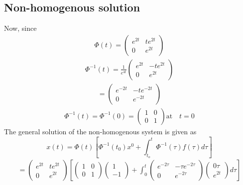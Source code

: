 \documentclass[a4paper, 12pt]{article}
\begin{document}
\subsection{Non-homogenous solution}
Now, since \begin{align*}
\varPhi (t) =
\begin{pmatrix}
e^{2t} & te^{2t}\\
0 & e^{2t}
\end{pmatrix}
\end{align*}
\begin{align*}
\varPhi^{-1} (t) = \frac{1}{e^{4t}}
\begin{pmatrix}
e^{2t} & -te^{2t}\\
0 & e^{2t}
\end{pmatrix}
\end{align*}
\begin{align*}
=
\begin{pmatrix}
e^{-2t} & -te^{-2t} \\
0 & e^{-2t}
\end{pmatrix}
\end{align*}
\begin{align*}
\varPhi^{-1} (t) = \varPhi^{-1}(0) =
\begin{pmatrix}
1 & 0\\
0 & 1
\end{pmatrix} \text{at} \quad t = 0
\end{align*}
The general solution of the non-homogenous system is given as  $$ x(t) = \varPhi (t) \left[\varPhi^{-1}(t_0)x^0 + \int_{t_o}^{t}\varPhi^{-1}(\tau)f(\tau)d\tau\right]$$
\begin{align*}
= 
\begin{pmatrix}
e^{2t} & te^{2t} \\
0 & e^{2t}
\end{pmatrix}
\left[
\begin{pmatrix}
1 & 0 \\
0 & 1
\end{pmatrix}
\begin{pmatrix}
1 \\
-1
\end{pmatrix} + \int_{0}^{t}
\begin{pmatrix}
e^{-2\tau} & -\tau e^{-2\tau} \\
0 & e^{-2\tau}
\end{pmatrix} 
\begin{pmatrix}
0 \tau \\
e^{2t} 
\end{pmatrix} d \tau
\right]
\end{align*}
\end{document}
